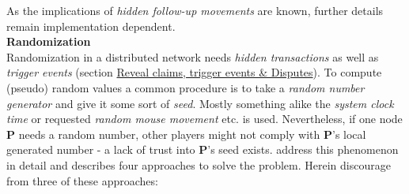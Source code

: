 As the implications of \textit{hidden follow-up movements} are known, further details remain implementation dependent. \\

\noindent \textbf{Randomization} \\
Randomization in a distributed network needs \textit{hidden transactions} as well as \textit{trigger events} (section \hyperref[sec:RcTeDisputes]{Reveal claims, trigger events \& Disputes}). \label{lbl:Randomization}
To compute (pseudo) random values a common procedure is to take a \textit{random number generator} and give it some sort of \textit{seed}.
Mostly something alike the \textit{system clock time} or requested \textit{random mouse movement} etc. is used.
Nevertheless, if one node \textbf{P} needs a random number, other players might not comply with \textbf{P}'s local generated number - a lack of trust into \textbf{P}'s seed exists.
\citet{Chatterjee.2019} address this phenomenon in detail and describes four approaches to solve the problem.
Herein \citet{Chatterjee.2019} discourage from three of these approaches:
